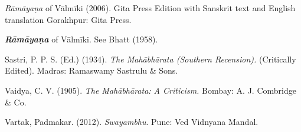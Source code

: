 \begin{thebibliography}{99}
  \textit{Rāmāyaṇa} of Vālmīki (2006). Gita Press Edition with Sanskrit text and English translation Gorakhpur: Gita Press.

  \textbf{\textit{Rāmāyaṇa}} of Vālmīki. See Bhatt (1958).

  Sastri, P. P. S. (Ed.) (1934). \textit{The Mahābhārata (Southern Recension).} (Critically Edited). Madras: Ramaswamy Sastrulu \& Sons.

  Vaidya, C. V. (1905). \textit{The Mahābhārata: A Criticism.} Bombay: A. J. Combridge \& Co.

  Vartak, Padmakar. (2012). \textit{Swayambhu}. Pune: Ved Vidnyana Mandal.

 \end{thebibliography}

